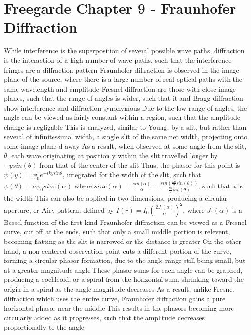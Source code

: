 \documentclass[11 pt, twoside]{article}
\newenvironment{outline*}
{
	\begin{outline}[enumerate]
	}
	{\end{outline}
}
\begin{document}
\section{Freegarde Chapter 9 - Fraunhofer Diffraction}
\begin{outline*}
\1 While interference is the superposition of several possible wave paths, diffraction is the interaction of a high number of wave paths, such that the interference fringes are a diffraction pattern
\1 Fraunhofer diffraction is observed in the image plane of the source, where there is a large number of real optical paths with the same wavelength and amplitude
\2 Fresnel diffraction are those with close image planes, such that the range of angles is wider, such that it and Bragg diffraction show interference and diffraction synonymous
\2 Due to the low range of angles, the angle can be viewed as fairly constant within a region, such that the amplitude change is negligable
\1 This is analyzed, similar to Young, by a slit, but rather than several of infinitessimal width, a single slit of the same net width, projecting onto some image plane d away
\2 As a result, when observed at some angle from the slit, $\theta$, each wave originating at position y within the slit travelled longer by $-ysin(\theta)$ from that of the center of the slit
\3 Thus, the phasor for this point is $\psi(y) = \psi_0e^{-ikysin\theta}$, integrated for the width of the slit, such that $\psi(\theta) = a\psi_0sinc(\alpha)$ where $sinc(\alpha) = \frac{sin(\alpha)}{\alpha} = \frac{sin(\frac{ka}{2}sin(\theta))}{\frac{ka}{2}sin(\theta)}$, such that a is the width
\1 This can also be applied in two dimensions, producing a circular aperture, or Airy pattern, defined by $I(r) = I_0(\frac{2J_1(\alpha)}{\alpha})^2$, where $J_1(\alpha)$ is a Bessel function of the first kind
\1 Fraunhofer diffraction can be viewed as a Fresnel curve, cut off at the ends, such that only a small middle portion is relevent, becoming flatting as the slit is narrowed or the distance is greater
\2 On the other hand, a non-centered observation point cuts a different portion of the curve, forming a circular phasor formation, due to the angle range still being small, but at a greater magnitude angle
\3 These phasor sums for each angle can be graphed, producing a cochleoid, or a spiral from the horizontal sum, shrinking toward the origin in a spiral as the angle magnitude decreases
\2 As a result, unlike Fresnel diffraction which uses the entire curve, Fraunhofer diffraction gains a pure horizontal phasor near the middle
\3 This results in the phasors becoming more circularly added as it progresses, such that the amplitude decreases proportionally to the angle

\end{outline*}
\end{document}
